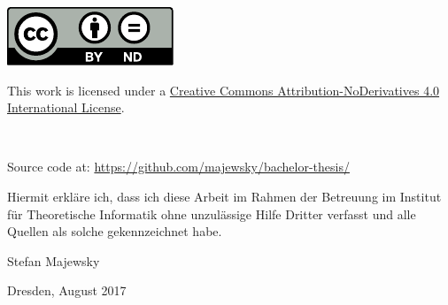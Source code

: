 \documentclass[
 paper=A4,pagesize=automedia,fontsize=11pt,
 BCOR=10mm,DIV=16,
 twoside,headinclude,footinclude=false,
 bibtotocnumbered,          %
 liststotoc,                %
 listsleft,
 pointlessnumbers,          %
 cleardoublepage=empty      %
]{scrbook}
\theoremstyle{definition}
\numberwithin{theorem}{chapter}
\numberwithin{equation}{chapter}
\numberwithin{figure}{chapter}
\numberwithin{table}{chapter}
\begin{document}
\begin{titlepage}
 \vspace*{5em}
 \begin{singlespace}
  \hspace{0.18\linewidth}
  \begin{minipage}{0.1\linewidth}
   \includegraphics[width=\linewidth]{img/by-nd.pdf}
  \end{minipage}
  \hspace{0.02\linewidth}
  \begin{minipage}{0.6\linewidth}\footnotesize\flushleft
   This work is licensed under a \href{https://creativecommons.org/licenses/by-nd/4.0/}{Creative Commons Attribution-NoDerivatives 4.0 International License}.
  \end{minipage}\\[-1em]
  \begin{center}\footnotesize
   Source code at: \url{https://github.com/majewsky/bachelor-thesis/}
  \end{center}
 \end{singlespace}
\end{titlepage}

\cleardoublepage
\tableofcontents
\mainmatter





\appendix{}
\renewcommand\thesection{\Alph{section}}
\renewcommand\theequation{\Alph{section}.\arabic{equation}}
\renewcommand\thefigure{\Alph{section}.\arabic{figure}}
\renewcommand\thetable{\Alph{section}.\arabic{table}}



\backmatter



\clearpage
\thispagestyle{empty}

\vspace*{1.5em}

Hiermit erkläre ich, dass ich diese Arbeit im Rahmen der Betreuung im Institut
für Theoretische Informatik ohne unzulässige Hilfe Dritter verfasst und alle
Quellen als solche gekennzeichnet habe.

\vspace*{15em}

Stefan Majewsky \par
Dresden, {\color{red}August 2017} %
\end{document}

